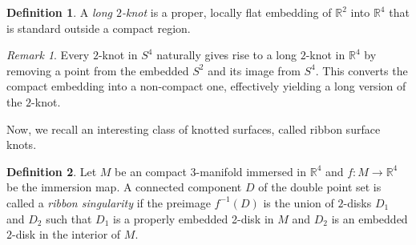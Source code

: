 \documentclass[10pt,a4paper,reqno]{amsart}
\theoremstyle{definition}
\newtheorem{definition}{Definition}[section]
\theoremstyle{remark}
\newtheorem{remark}[theorem]{Remark}
\newcommand{\R}{\mathbb R}
\begin{document}
\begin{definition}
	A \emph{long $2$-knot} is a proper, locally flat embedding of $\R^2$ into $\R^4$ that is standard outside a compact region.
\end{definition}

\begin{remark}
	Every $2$-knot in $S^4$ naturally gives rise to a long $2$-knot in $\R^4$ by removing a point from the embedded $S^2$ and its image from $S^4$. This converts the compact embedding into a non-compact one, effectively yielding a long version of the $2$-knot.
\end{remark}
    Now, we recall an interesting class of knotted surfaces, called ribbon surface knots.
\begin{definition}
	Let $M$ be an compact $3$-manifold immersed in $\R^{4}$ and $f:M \rightarrow \R^{4}$ be the immersion map. A connected component $D$ of the double point set is called a {\it ribbon singularity} if the preimage $f^{-1}(D)$ is the union of $2$-disks $D_{1}$ and $D_{2}$ such that $D_{1}$ is a properly embedded 2-disk in $M$ and $D_{2}$ is an embedded $2$-disk in the interior of $M$.
\end{definition}
\end{document}
